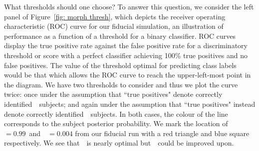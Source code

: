 What thresholds should one choose? To answer this question, we consider the left panel of
Figure~\ref{fig: morph thresh}, which depicts the receiver operating 
characteristic (ROC) curve for our fiducial simulation, an illustration of performance as a 
function of a threshold for a binary classifier. 
ROC curves display the true positive rate against the false positive rate for 
a discriminatory threshold or score with a perfect classifier achieving 100\% true positives
and no false positives. The value of the threshold optimal for predicting class labels would 
be that which allows the ROC curve to reach the upper-left-most point in the diagram. 
We have two thresholds to consider and thus we plot the curve twice: 
once under the assumption that ``true positives" denote correctly identified~\feat~subjects; 
and again under the assumption that ``true positives" instead denote correctly identified~\notfeat~subjects.  In both cases, the colour of the line corresponds to the 
subject posterior probability. We mark the location of~\tf~$=0.99$~and~\tn~$=0.004$
from our fiducial run with a red triangle and blue square respectively. 
 We see that~\tf~is nearly optimal but~\tn~could be improved upon.